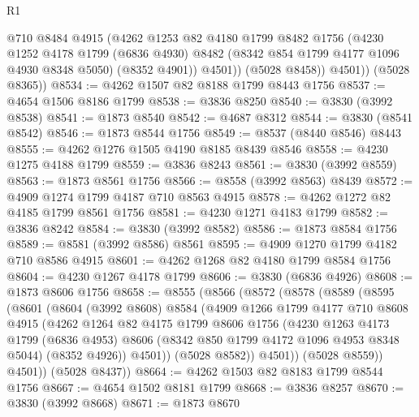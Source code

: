 \begin{lexlean}{R1}
\begin{coremodule}
              @710
              @8484
              @4915
              (@4262
                @1253
                @82
                @4180
                @1799
                @8482
                @1756
                (@4230
                  @1252
                  @4178
                  @1799
                  (@6836 @4930)
                  @8482
                  (@8342 @854 @1799 @4177 @1096 @4930 @8348 @5050)
                  (@8352 @4901))
                @4501))
            (@5028 @8458))
          @4501))
      (@5028 @8365))
@8534 := @4262 @1507 @82 @8188 @1799 @8443 @1756
@8537 := @4654 @1506 @8186 @1799
@8538 := @3836 @8250
@8540 := @3830 (@3992 @8538)
@8541 := @1873 @8540
@8542 := @4687 @8312
@8544 := @3830 (@8541 @8542)
@8546 := @1873 @8544 @1756
@8549 := @8537 (@8440 @8546) @8443
@8555 := @4262 @1276 @1505 @4190 @8185 @8439 @8546
@8558 := @4230 @1275 @4188 @1799
@8559 := @3836 @8243
@8561 := @3830 (@3992 @8559)
@8563 := @1873 @8561 @1756
@8566 := @8558 (@3992 @8563) @8439
@8572 := @4909 @1274 @1799 @4187 @710 @8563 @4915
@8578 := @4262 @1272 @82 @4185 @1799 @8561 @1756
@8581 := @4230 @1271 @4183 @1799
@8582 := @3836 @8242
@8584 := @3830 (@3992 @8582)
@8586 := @1873 @8584 @1756
@8589 := @8581 (@3992 @8586) @8561
@8595 := @4909 @1270 @1799 @4182 @710 @8586 @4915
@8601 := @4262 @1268 @82 @4180 @1799 @8584 @1756
@8604 := @4230 @1267 @4178 @1799
@8606 := @3830 (@6836 @4926)
@8608 := @1873 @8606 @1756
@8658 := @8555
    (@8566
      (@8572
        (@8578
          (@8589
            (@8595
              (@8601
                (@8604
                  (@3992 @8608)
                  @8584
                  (@4909
                    @1266
                    @1799
                    @4177
                    @710
                    @8608
                    @4915
                    (@4262
                      @1264
                      @82
                      @4175
                      @1799
                      @8606
                      @1756
                      (@4230
                        @1263
                        @4173
                        @1799
                        (@6836 @4953)
                        @8606
                        (@8342 @850 @1799 @4172 @1096 @4953 @8348 @5044)
                        (@8352 @4926))
                      @4501))
                  (@5028 @8582))
                @4501))
            (@5028 @8559))
          @4501))
      (@5028 @8437))
@8664 := @4262 @1503 @82 @8183 @1799 @8544 @1756
@8667 := @4654 @1502 @8181 @1799
@8668 := @3836 @8257
@8670 := @3830 (@3992 @8668)
@8671 := @1873 @8670

\end{coremodule}
\end{lexlean}
